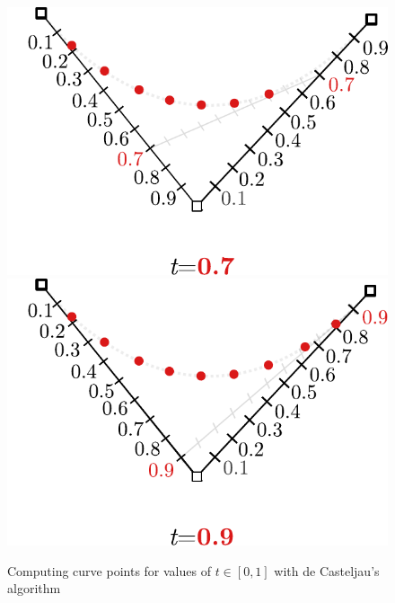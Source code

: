 \documentclass[12pt,openany,a4,usenames,dvipsnames]{book}
\begin{document}
\begin{figure}[H]
\begin{minipage}{0.49\textwidth}
    \includegraphics[width=\textwidth,keepaspectratio]{figures/bezier_step_0.7.pdf}
  \end{minipage}
  \hspace{.1em}
  \begin{minipage}{0.49\textwidth}
    \includegraphics[width=\textwidth,keepaspectratio]{figures/bezier_step_0.9.pdf}
  \end{minipage}\par
  \vspace{1em}
  {\noindent{}Computing curve points for values of $t \in [0, 1]$ with de Casteljau's algorithm}
\end{figure}
\end{document}
